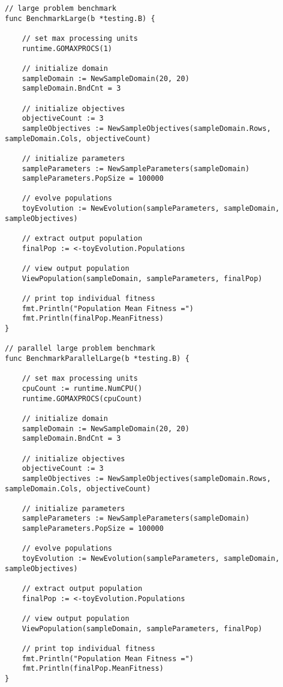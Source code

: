 \begin{lstlisting}[basicstyle=\tiny]
// large problem benchmark
func BenchmarkLarge(b *testing.B) {

	// set max processing units
	runtime.GOMAXPROCS(1)

	// initialize domain
	sampleDomain := NewSampleDomain(20, 20)
	sampleDomain.BndCnt = 3

	// initialize objectives
	objectiveCount := 3
	sampleObjectives := NewSampleObjectives(sampleDomain.Rows, sampleDomain.Cols, objectiveCount)

	// initialize parameters
	sampleParameters := NewSampleParameters(sampleDomain)
	sampleParameters.PopSize = 100000

	// evolve populations
	toyEvolution := NewEvolution(sampleParameters, sampleDomain, sampleObjectives)

	// extract output population
	finalPop := <-toyEvolution.Populations

	// view output population
	ViewPopulation(sampleDomain, sampleParameters, finalPop)

	// print top individual fitness
	fmt.Println("Population Mean Fitness =")
	fmt.Println(finalPop.MeanFitness)
}

// parallel large problem benchmark
func BenchmarkParallelLarge(b *testing.B) {

	// set max processing units
	cpuCount := runtime.NumCPU()
	runtime.GOMAXPROCS(cpuCount)

	// initialize domain
	sampleDomain := NewSampleDomain(20, 20)
	sampleDomain.BndCnt = 3

	// initialize objectives
	objectiveCount := 3
	sampleObjectives := NewSampleObjectives(sampleDomain.Rows, sampleDomain.Cols, objectiveCount)

	// initialize parameters
	sampleParameters := NewSampleParameters(sampleDomain)
	sampleParameters.PopSize = 100000

	// evolve populations
	toyEvolution := NewEvolution(sampleParameters, sampleDomain, sampleObjectives)

	// extract output population
	finalPop := <-toyEvolution.Populations

	// view output population
	ViewPopulation(sampleDomain, sampleParameters, finalPop)

	// print top individual fitness
	fmt.Println("Population Mean Fitness =")
	fmt.Println(finalPop.MeanFitness)
}

\end{lstlisting}

\newpage

